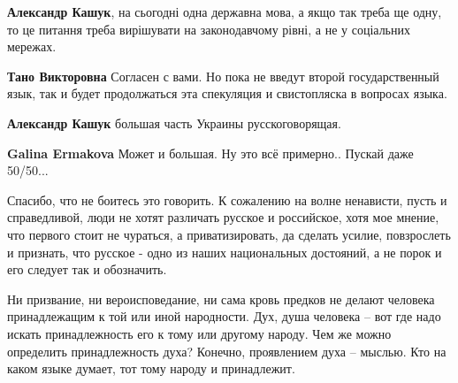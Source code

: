 \begin{itemize}
{\begin{itemize}
\textbf{Александр Кашук}, на сьогодні одна державна мова, а якщо так треба ще
одну, то це питання треба вирішувати на законодавчому рівні, а не у соціальних
мережах.

\textbf{Тано Викторовна} Согласен с вами. Но пока не введут второй
государственный язык, так и будет продолжаться эта спекуляция и свистопляска в
вопросах языка.

\textbf{Александр Кашук} большая часть Украины русскоговорящая.

\textbf{Galina Ermakova} Может и большая. Ну это всё примерно.. Пускай даже 50/50...

\end{itemize}



Спасибо, что не боитесь это говорить. К сожалению на волне ненависти, пусть и
справедливой, люди не хотят различать русское и российское, хотя мое мнение,
что первого стоит не чураться, а приватизировать, да сделать усилие,
повзрослеть и признать, что русское - одно из наших национальных достояний, а
не порок и его следует так и обозначить.


Ни призвание, ни вероисповедание, ни сама кровь предков не делают человека
принадлежащим к той или иной народности. Дух, душа человека – вот где надо
искать принадлежность его к тому или другому народу. Чем же можно определить
принадлежность духа? Конечно, проявлением духа – мыслью. Кто на каком языке
думает, тот тому народу и принадлежит.


}
\end{itemize}
